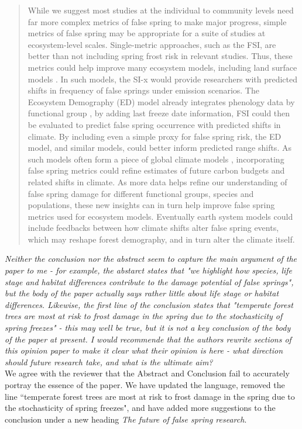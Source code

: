 \documentclass[11pt,a4paper]{article}
\begin{document}
\begin{quotation}
While we suggest most studies at the individual to community levels need far more complex metrics of false spring to make major progress, simple metrics of false spring may be appropriate for a suite of studies at ecosystem-level scales. Single-metric approaches, such as the FSI, are better than not including spring frost risk in relevant studies. Thus, these metrics could help improve many ecosystem models, including land surface models \citep{Foley1998, Moorcroft2001, Prentice1992}. In such models, the SI-x would provide researchers with predicted shifts in frequency of false springs under emission scenarios. The Ecosystem Demography (ED) model already integrates phenology data by functional group \citep{Kim2015, Moorcroft2001}, by adding last freeze date information, FSI could then be evaluated to predict false spring occurrence with predicted shifts in climate. By including even a simple proxy for false spring risk, the ED model, and similar models, could better inform predicted range shifts. As such models often form a piece of global climate models \citep{Yu2016}, incorporating false spring metrics could refine estimates of future carbon budgets and related shifts in climate. As more data helps refine our understanding of false spring damage for different functional groups, species and populations, these new insights can in turn help improve false spring metrics used for ecosystem models. Eventually earth system models could include feedbacks between how climate shifts alter false spring events, which may reshape forest demography, and in turn alter the climate itself.
\end{quotation} 

\textit{Neither the conclusion nor the abstract seem to capture the main argument of the paper to me - for example, the abstarct states that "we highlight how species, life stage and habitat differences contribute to the damage potential of false springs", but the body of the paper actually says rather little about life stage or habitat differences.  Likewise, the first line of the conclusion states that "temperate forest trees are most at risk to frost damage in the spring due to the stochasticity of spring freezes" - this may well be true, but it is not a key conclusion of the body of the paper at present. I would recommende that the authors rewrite sections of this opinion paper to make it clear what their opinion is here - what direction should future research take, and what is the ultimate aim?} \\

We agree with the reviewer that the Abstract and Conclusion fail to accurately portray the essence of the paper. We have updated the language, removed the line ``temperate forest trees are most at risk to frost damage in the spring due to the stochasticity of spring freezes", and have added more suggestions to the conclusion under a new heading \textit{The future of false spring research}. \\ 
\end{document}
